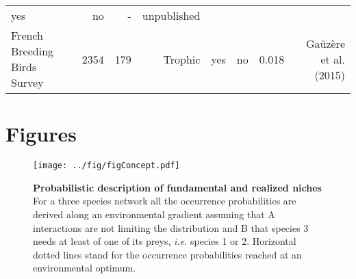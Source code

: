 \begin{longtable}[]{@{}lrrrrrrr@{}}
\begin{minipage}[t]{0.05\columnwidth}
yes\strut
\end{minipage} & \begin{minipage}[t]{0.04\columnwidth}\raggedleft\strut
no\strut
\end{minipage} & \begin{minipage}[t]{0.06\columnwidth}\raggedleft\strut
-\strut
\end{minipage} & \begin{minipage}[t]{0.22\columnwidth}\raggedleft\strut
unpublished\strut
\end{minipage}\tabularnewline
\begin{minipage}[t]{0.15\columnwidth}\raggedright\strut
French Breeding Birds Survey\strut
\end{minipage} & \begin{minipage}[t]{0.07\columnwidth}\raggedleft\strut
2354\strut
\end{minipage} & \begin{minipage}[t]{0.07\columnwidth}\raggedleft\strut
179\strut
\end{minipage} & \begin{minipage}[t]{0.11\columnwidth}\raggedleft\strut
Trophic\strut
\end{minipage} & \begin{minipage}[t]{0.05\columnwidth}\raggedleft\strut
yes\strut
\end{minipage} & \begin{minipage}[t]{0.04\columnwidth}\raggedleft\strut
no\strut
\end{minipage} & \begin{minipage}[t]{0.06\columnwidth}\raggedleft\strut
0.018\strut
\end{minipage} & \begin{minipage}[t]{0.22\columnwidth}\raggedleft\strut
Gaüzère et al. (2015)\strut
\end{minipage}\tabularnewline
\bottomrule
\end{longtable}

\newpage

\section{Figures}\label{figures}

\begin{figure}[htbp]
\centering
\texttt{[image: ../fig/figConcept.pdf]}
\caption{\textbf{Probabilistic description of fundamental and realized
niches} For a three species network all the occurrence probabilities are
derived along an environmental gradient assuming that A interactions are
not limiting the distribution and B that species 3 needs at least of one
of its preys, \emph{i.e.} species 1 or 2. Horizontal dotted lines stand
for the occurrence probabilities reached at an environmental
optimum.\label{fig:box1}}
\end{figure}

